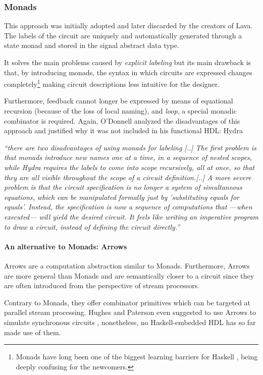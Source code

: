 \subsubsection{Monads} 
This approach was initially adopted and later discarded by the
creators of Lava. The labels of the circuit are uniquely and
automatically generated through a state monad and stored in the signal
abstract data type.


It solves the main problems caused by \textit{explicit labeling} but
its main drawback is that, by introducing monads, the syntax in which
circuits are expressed changes completely\footnote{Monads have long
  been one of the biggest learning barriers for Haskell \cite{monads},
  being deeply confusing for the newcomers.} making circuit
descriptions less intuitive for the designer.
  

  Furthermore, feedback cannot longer be expressed by means of
  equational recursion (because of the loss of local naming), and
  \textit{loop}, a special monadic combinator is required. Again,
  O'Donnell analyzed the disadvantages of this approach and justified
  why it was not included in his functional HDL: Hydra \cite{hydra}
  
  
  \textit{``there are two disadvantages of using monads for labeling
    [..]  The first problem is that monads introduce new names
    one at a time, in a sequence of nested scopes, while Hydra
    requires the labels to come into scope recursively, all at once,
    so that they are all visible throughout the scope of a circuit
    definition.[..] A more severe problem is that the circuit
    specification is no longer a system of simultaneous equations,
    which can be manipulated formally just by 'substituting equals
    for equals'. Instead, the specification is now a sequence of
    computations that ---when executed--- will yield the desired circuit.
    It feels like writing an imperative program to draw a circuit,
    instead of defining the circuit directly.''} \cite{hydra:th}

  \paragraph{An alternative to Monads: Arrows}
  Arrows \cite{arrows} are a computation abstraction similar to Monads.
  Furthermore, Arrows are more general than Monads and are semantically
  closer to a circuit since they are often introduced from the
  perspective of stream processors. 

  Contrary to Monads, they offer combinator primitives which can be
  targeted at parallel stream processing. Hughes and Paterson even
  suggested to use Arrows to simulate synchronous circuits
   \cite{arrows:new,arrows:prog}, nonetheless, no Haskell-embedded HDL
  has so far made use of them.
  
